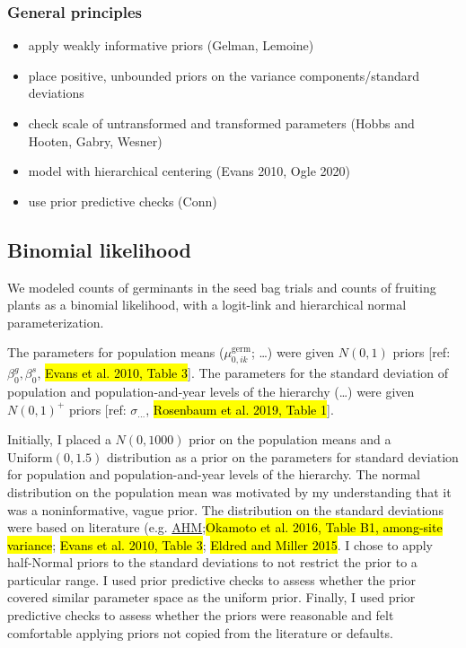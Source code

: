 \documentclass[12pt, oneside, titlepage]{article}   	%
\begin{document}
\subsubsection*{General principles}

\begin{itemize}
\item apply weakly informative priors (Gelman, Lemoine)
\item place positive, unbounded priors on the variance components/standard deviations
\item check scale of untransformed and transformed parameters (Hobbs and Hooten, Gabry, Wesner)
\item model with hierarchical centering (Evans 2010, Ogle 2020)
\item use prior predictive checks (Conn)
\end{itemize}


\subsection*{Binomial likelihood}

We modeled counts of germinants in the seed bag trials and counts of fruiting plants as a binomial likelihood, with a logit-link and hierarchical normal parameterization. 

The parameters for population means ($\mu_{0,ik}^\mathrm{germ}$; \dots) were given $N(0,1)$ priors [ref: $\beta_0^g, \beta_0^s$, \hl{Evans et al. 2010, Table 3}]. The parameters for the standard deviation of population and population-and-year levels of the hierarchy (\dots) were given $N(0,1)^+$ priors [ref: $\sigma_{\dots}$, \hl{Rosenbaum et al. 2019, Table 1}]. 

Initially, I placed a $N(0,1000)$ prior on the population means and a $\mathrm{Uniform}(0,1.5)$ distribution as a prior on the parameters for standard deviation for population and population-and-year levels of the hierarchy. The normal distribution on the population mean was motivated by my understanding that it was a noninformative, vague prior. The distribution on the standard deviations were based on literature (e.g.  \href{www.mbr-pwrc.usgs.gov/pubanalysis/keryroylebook/R_BUGS_code_AHM_Vol_1_20170519.R}{AHM};\hl{Okamoto et al. 2016, Table B1, among-site variance}; \hl{Evans et al. 2010, Table 3}; \hl{Eldred and Miller 2015}. I chose to apply half-Normal priors to the standard deviations to not restrict the prior to a particular range. I used prior predictive checks to assess whether the prior covered similar parameter space as the uniform prior. Finally, I used prior predictive checks to assess whether the priors were reasonable and felt comfortable applying priors not copied from the literature or defaults. 
\end{document}
